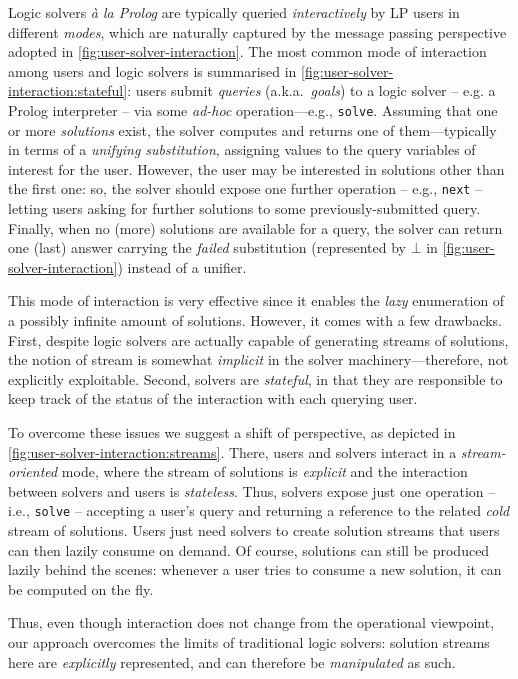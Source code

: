 \documentclass[12pt,a4paper,openright,twoside]{book}
\begin{document}
Logic solvers \emph{à la Prolog} are typically queried \emph{interactively} by LP users in different \emph{modes}, which are naturally captured by the message passing perspective adopted in \cref{fig:user-solver-interaction}.
%
The most common mode of interaction among users and logic solvers is summarised in \cref{fig:user-solver-interaction:stateful}: users submit \emph{queries} (a.k.a.\ \emph{goals}) to a logic solver -- e.g. a Prolog interpreter -- via some \textit{ad-hoc} operation---e.g., \texttt{solve}.
%
Assuming that one or more \emph{solutions} exist, the solver computes and returns one of them---typically in terms of a \emph{unifying substitution}, assigning values to the query variables of interest for the user.
%
However, the user may be interested in solutions other than the first one: so, the solver should expose one further operation -- e.g., \texttt{next} -- letting users asking for further solutions to some previously-submitted query.
%
Finally, when no (more) solutions are available for a query, the solver can return one (last) answer carrying the \emph{failed} substitution (represented by $\bot$ in \cref{fig:user-solver-interaction}) instead of a unifier.

This mode of interaction is very effective since it enables the \emph{lazy} enumeration of a possibly infinite amount of solutions.
%
However, it comes with a few drawbacks.
%
First, despite logic solvers are actually capable of generating streams of solutions, the notion of stream is somewhat \emph{implicit} in the solver machinery---therefore, not explicitly exploitable.
%
Second, solvers are \emph{stateful}, in that they are responsible to keep track of the status of the interaction with each querying user.

To overcome these issues we suggest a shift of perspective, as depicted in \cref{fig:user-solver-interaction:streams}.
%
There, users and solvers interact in a \emph{stream-oriented} mode, where the stream of solutions is \emph{explicit} and the interaction between solvers and users is \emph{stateless}.
%
Thus, solvers expose just one operation -- i.e., \texttt{solve} -- accepting a user's query and returning a reference to the related \emph{cold} stream of solutions.
%
Users just need solvers to create solution streams that users can then lazily consume on demand.
%
Of course, solutions can still be produced lazily behind the scenes: whenever a user tries to consume a new solution, it can be computed on the fly.

Thus, even though interaction does not change from the operational viewpoint, our approach overcomes the limits of traditional logic solvers: solution streams here are \emph{explicitly} represented, and can therefore be \emph{manipulated} as such.
\end{document}
